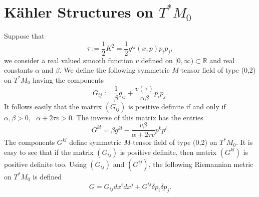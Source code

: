 \documentclass[10pt,a4paper]{article}
\theoremstyle{plain}
\theoremstyle{definition}
\begin{document}
\section{ K\"{a}hler Structures on $T^{\ast}M_0$}
Suppose that 
\begin{equation}
 \tau :=\frac{1}{2}K^2=\frac{1}{2}g^{ij}(x,p)p_{i}p_{j},
\end{equation}
we consider a real valued smooth function $v$ defined on
$[0,\infty)\subset {\mathbb R} $ and real constants $\alpha $ and
$\beta$. We define the following symmetric $M$-tensor field of type
(0,2) on $T^{\ast}M_0$ having the components
\begin{equation}
G_{ij}:=\frac{1}{\beta}g_{ij}+\frac{v(\tau )}{\alpha \beta }p_{i}
p_{j}.
\end{equation}
It follows easily that the matrix  $(G_{ij})$ is positive definite
if and only if  $\alpha ,\beta >0,\, \, \,\, \alpha +2\tau v>0.$ The
inverse of this matrix has the entries
\begin{equation}
G^{kl}=\beta g^{kl}-\frac{v\beta }{\alpha +2\tau v}p^{k} p^{l}.
\end{equation}
The components  $G^{kl} $ define symmetric  $M$-tensor field of
type (0,2) on  $T^{\ast}M_0$. It is easy to see that if the matrix
$(G_{ij} )$ is positive definite, then matrix $(G^{kl} )$ is
positive definite too. Using $(G_{ij})$ and $(G^{ij})$, the following Riemannian metric
 on $T^{\ast}M_0$ is defined
\begin{equation}
G=G_{ij}dx^{i}dx^{j}+G^{ij}\delta p_{i}\delta p_{j}.
\end{equation}
\end{document}
